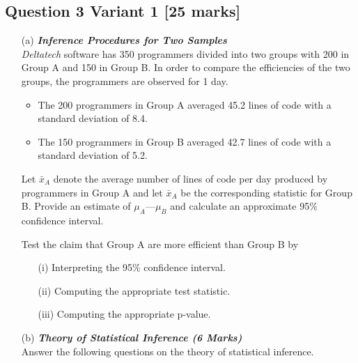 \documentclass[]{article}
\begin{document}
\subsection*{Question 3 Variant 1 [25 marks]}



\begin{itemize}

\item[(a)] \textbf{\textit{Inference Procedures for Two Samples }}\\

\textit{Deltatech} software has 350 programmers divided into two groups with 200 in Group A
and 150 in Group B. In order to compare the efficiencies of the two groups, the
programmers are observed for 1 day.
\begin{itemize}

\item The 200 programmers in Group A averaged 45.2 lines of code with a standard
deviation of 8.4.

\item The 150 programmers in Group B averaged 42.7 lines of code with a standard
deviation of 5.2.
\end{itemize}
Let $\bar{x}_A$ denote the average number of lines of code per day produced by programmers in
Group A and
let $\bar{x}_A$ be the corresponding statistic for Group B.
Provide an estimate of $\mu_A —\mu_B$ and calculate an approximate 95\% confidence interval.

Test the claim that Group A are more efficient than Group B by
\begin{itemize}

\item[(i)]Interpreting the 95\% confidence interval.

\item[(ii)] Computing the appropriate test statistic.
%
\item[(iii)] Computing the appropriate p-value.
\end{itemize}


\item[(b)] \textbf{\textit{Theory of Statistical Inference (6 Marks)}}\\Answer the following questions on the theory of statistical inference.
\begin{itemize}


\end{itemize}
\end{itemize}
\end{document}
